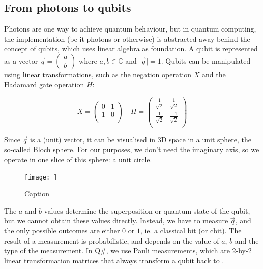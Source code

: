 \documentclass[oneside,a4paper]{article}
\begin{document}
\subsection{From photons to qubits}
Photons are one way to achieve quantum behaviour, but in quantum computing, the implementation (be it photons or otherwise) is abstracted away behind the concept of qubits, which uses linear algebra as foundation.
A qubit is represented as a vector $\vec{q}=\begin{pmatrix} a \\ b\end{pmatrix}$ where $a, b \in \mathbb{C}$ and $\lvert \vec{q} \rvert =1$.
Qubits can be manipulated using linear transformations, such as the negation operation $X$ and the Hadamard gate operation $H$:

\begin{equation}
    X = \begin{pmatrix} 0 & 1 \\ 1 & 0 \\\end{pmatrix} \quad
    H = \begin{pmatrix} \frac{1}{\sqrt{2}} & \frac{1}{\sqrt{2}} \\ \frac{1}{\sqrt{2}} & \frac{-1}{\sqrt{2}} \\\end{pmatrix}
\end{equation}

Since $\vec{q}$ is a (unit) vector, it can be visualised in 3D space in a unit sphere, the so-called Bloch sphere.
For our purposes, we don't need the imaginary axis, so we operate in one slice of this sphere: a unit circle.

\begin{figure}
    \centering
    \texttt{[image: ]}
    \caption{Caption}
    \label{fig:my_label}
\end{figure}


The $a$ and $b$ values determine the superposition or quantum state of the qubit, but we cannot obtain these values directly. Instead, we have to measure $\vec{q}$, and the only possible outcomes are either $0$ or $1$, ie. a classical bit (or cbit).
The result of a measurement is probabilistic, and depends on the value of $a$, $b$ and the type of the measurement.
In Q\#, we use Pauli measurements, which are 2-by-2 linear transformation matrices that always transform a qubit back to .






\end{document}
